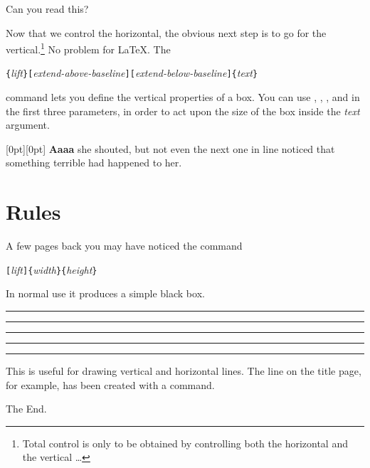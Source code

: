 \begin{example}
\par
{}\par
{} \par
{} \par
{} 
Can you read this?
\end{example}

Now that we control the horizontal, the obvious next step is to go for
  the vertical.\footnote{Total control is only to be obtained by
  controlling both the horizontal and the vertical \ldots}
 No problem for \LaTeX{}. The


\begin{lscommand}
\verb|{|\emph{lift}\verb|}[|\emph{extend-above-baseline}\verb|][|\emph{extend-below-baseline}\verb|]{|\emph{text}\verb|}|
\end{lscommand}

\noindent command lets you define the vertical properties of a
box. You can use , , , and
   in the first three parameters, in order to act
  upon the size of the box inside the \emph{text} argument.


\begin{example}
\raisebox{0pt}[0pt][0pt]{\Large%
\textbf{Aaaa\raisebox{-0.3ex}{a}%
\raisebox{-0.7ex}{aa}%
\raisebox{-1.2ex}{r}%
\raisebox{-2.2ex}{g}%
\raisebox{-4.5ex}{h}}}
she shouted, but not even the next
one in line noticed that something
terrible had happened to her.
\end{example}

\section{Rules}
\label{sec:rule}

A few pages back you may have noticed the command

\begin{lscommand}
\verb|[|\emph{lift}\verb|]{|\emph{width}\verb|}{|\emph{height}\verb|}|
\end{lscommand}

\noindent In normal use it produces a simple black box.

\begin{example}
\rule{3mm}{.1pt}%
\rule[-1mm]{5mm}{1cm}%
\rule{3mm}{.1pt}%
\rule[1mm]{1cm}{5mm}%
\rule{3mm}{.1pt}
\end{example}

\noindent This is useful for drawing vertical and horizontal
lines. The line on the title page, for example, has been created with a
 command.

\bigskip
{\flushright The End.\par}

%

